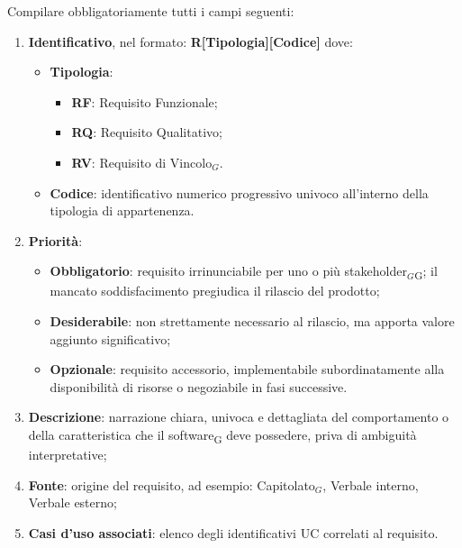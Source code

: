 \documentclass[a4paper, 10pt]{article}
\begin{document}
\noindent Compilare obbligatoriamente tutti i campi seguenti:

\begin{enumerate}
    \item \textbf{Identificativo}, nel formato:
    \noindent\textbf{R[Tipologia][Codice]}
    dove:
    \begin{itemize}
        \item \textbf{Tipologia}:
        \begin{itemize}
            \item \textbf{RF}: Requisito Funzionale;
            \item \textbf{RQ}: Requisito Qualitativo;
            \item \textbf{RV}: Requisito di Vincolo$_G$.
        \end{itemize}
        \item \textbf{Codice}: identificativo numerico progressivo univoco all'interno della tipologia di appartenenza.
    \end{itemize}

    \item \textbf{Priorità}:
    \begin{itemize}
        \item \textbf{Obbligatorio}: requisito irrinunciabile per uno o più stakeholder$_G$\textsubscript{G}; il mancato soddisfacimento pregiudica il rilascio del prodotto;
        \item \textbf{Desiderabile}: non strettamente necessario al rilascio, ma apporta valore aggiunto significativo;
        \item \textbf{Opzionale}: requisito accessorio, implementabile subordinatamente alla disponibilità di risorse o negoziabile in fasi successive.
    \end{itemize}

    \item \textbf{Descrizione}: narrazione chiara, univoca e dettagliata del comportamento o della caratteristica che il software\textsubscript{G} deve possedere, priva di ambiguità interpretative;

    \item \textbf{Fonte}: origine del requisito, ad esempio: Capitolato$_G$, Verbale interno, Verbale esterno;

    \item \textbf{Casi d'uso associati}: elenco degli identificativi UC correlati al requisito.
\end{enumerate}
\end{document}
